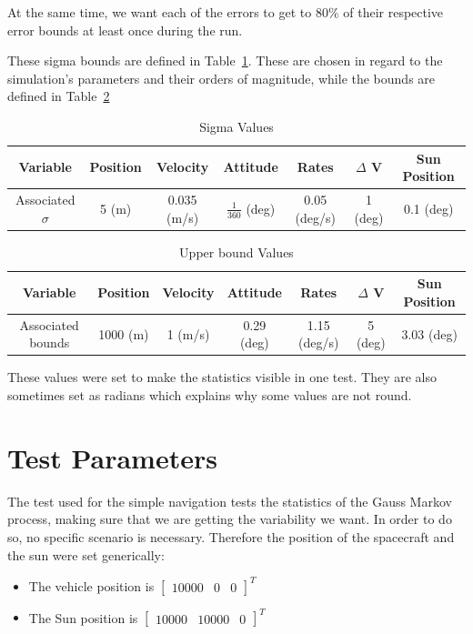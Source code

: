 At the same time, we want each of the errors to get to $80\%$ of their respective error bounds
at least once during the run.

These sigma bounds are defined in Table~\ref{tab:sigmas}. These are chosen in regard to
the simulation's parameters and their orders of magnitude, while the bounds are defined in
Table~\ref{tab:bounds}

\begin{table}[htbp]
    \caption{Sigma Values}
\label{tab:sigmas}
    \centering \fontsize{10}{10}\selectfont
\begin{tabular}{|c||c|c|c|c|c|c|}
\hline
Variable & Position & Velocity & Attitude & Rates & $\Delta$ V & Sun Position \\ \hline \hline
Associated $\sigma$ & 5 (m)& 0.035 (m/s)& $\frac{1}{360}$ (deg) & 0.05 (deg/s) & 1 (deg) & 0.1 (deg) \\ \hline
\end{tabular}
\end{table}

\begin{table}[htbp]
    \caption{Upper bound Values}
\label{tab:bounds}
    \centering \fontsize{10}{10}\selectfont
\begin{tabular}{|c||c|c|c|c|c|c|}
\hline
Variable & Position & Velocity & Attitude & Rates & $\Delta$ V & Sun Position \\ \hline \hline
Associated bounds & 1000 (m)& 1 (m/s)& 0.29 (deg) & 1.15 (deg/s) & 5 (deg) & 3.03 (deg) \\ \hline
\end{tabular}
\end{table}

These values were set to make the statistics visible in one test. They are also sometimes set as radians which explains why some values are not round.



\section{Test Parameters}

The test used for the simple navigation tests the statistics of the Gauss Markov process, making sure that we are getting the variability we want. In order to do so, no specific scenario is necessary. Therefore the position of the spacecraft and the sun were set generically:

\begin{itemize}
	\item[-] The vehicle position is $\begin{bmatrix}10000 & 0 & 0 \end{bmatrix}^T$
	\item[-] The Sun position is  $\begin{bmatrix}10000 & 10000 & 0 \end{bmatrix}^T$
\end{itemize}

